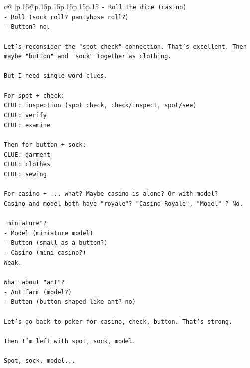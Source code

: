 \documentclass{article}
\begin{document}
{\begin{supertabular}{c@{$\;$}|p{.15\linewidth}@{}p{.15\linewidth}p{.15\linewidth}p{.15\linewidth}p{.15\linewidth}p{.15\linewidth}}
{{{\texttt{{-} Roll the dice (casino)} \\
\texttt{{-} Roll (sock roll? pantyhose roll?)} \\
\texttt{{-} Button? no.} \\
\\ 
\texttt{Let's reconsider the "spot check" connection. That's excellent. Then maybe "button" and "sock" together as clothing.} \\
\\ 
\texttt{But I need single word clues.} \\
\\ 
\texttt{For spot + check:} \\
\texttt{CLUE: inspection (spot check, check/inspect, spot/see)} \\
\texttt{CLUE: verify} \\
\texttt{CLUE: examine} \\
\\ 
\texttt{Then for button + sock:} \\
\texttt{CLUE: garment} \\
\texttt{CLUE: clothes} \\
\texttt{CLUE: sewing} \\
\\ 
\texttt{For casino + ... what? Maybe casino is alone? Or with model?} \\
\texttt{Casino and model both have "royale"? "Casino Royale", "Model" ? No.} \\
\\ 
\texttt{"miniature"?} \\
\texttt{{-} Model (miniature model)} \\
\texttt{{-} Button (small as a button?)} \\
\texttt{{-} Casino (mini casino?)} \\
\texttt{Weak.} \\
\\ 
\texttt{What about "ant"?} \\
\texttt{{-} Ant farm (model?)} \\
\texttt{{-} Button (button shaped like ant? no)} \\
\\ 
\texttt{Let's go back to poker for casino, check, button. That's strong.} \\
\\ 
\texttt{Then I'm left with spot, sock, model.} \\
\\ 
\texttt{Spot, sock, model...} \\
}}}
\end{supertabular}}
\end{document}
